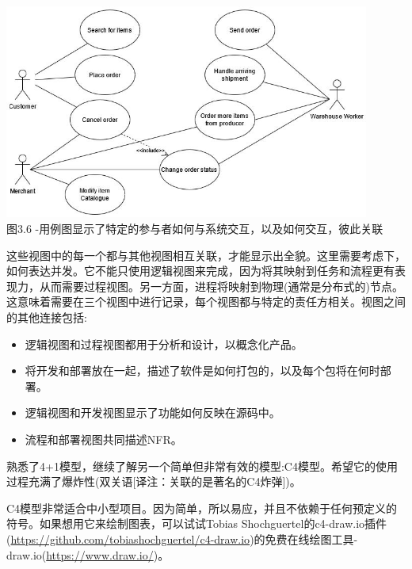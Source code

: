 \begin{itemize}
\begin{center}
\includegraphics[width=0.9\textwidth]{content/1/chapter3/images/6.jpg}\\
图3.6 -用例图显示了特定的参与者如何与系统交互，以及如何交互，彼此关联
\end{center}

\end{itemize}

这些视图中的每一个都与其他视图相互关联，才能显示出全貌。这里需要考虑下，如何表达并发。它不能只使用逻辑视图来完成，因为将其映射到任务和流程更有表现力，从而需要过程视图。另一方面，进程将映射到物理(通常是分布式的)节点。这意味着需要在三个视图中进行记录，每个视图都与特定的责任方相关。视图之间的其他连接包括:

\begin{itemize}
\item
逻辑视图和过程视图都用于分析和设计，以概念化产品。

\item 
将开发和部署放在一起，描述了软件是如何打包的，以及每个包将在何时部署。

\item
逻辑视图和开发视图显示了功能如何反映在源码中。

\item
流程和部署视图共同描述NFR。
\end{itemize}

熟悉了4+1模型，继续了解另一个简单但非常有效的模型:C4模型。希望它的使用过程充满了爆炸性(双关语[译注：关联的是著名的C4炸弹])。


C4模型非常适合中小型项目。因为简单，所以易应，并且不依赖于任何预定义的符号。如果想用它来绘制图表，可以试试Tobias Shochguertel的c4-draw.io插件(\url{https://github.com/tobiashochguertel/c4-draw.io})的免费在线绘图工具-draw.io(\url{https://www.draw.io/})。

